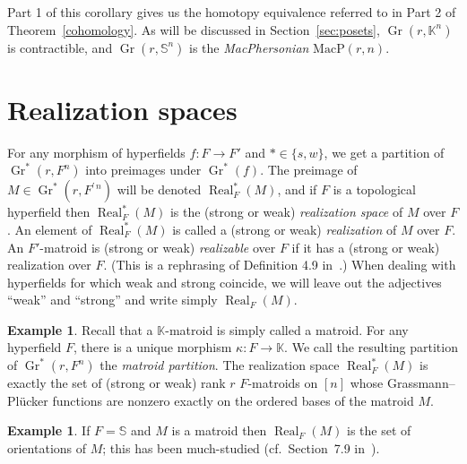 \documentclass[10pt, preprint]{article}
\theoremstyle{definition}
\newtheorem{example}[theorem]{Example}
\begin{document}
Part 1 of this corollary gives us the homotopy equivalence referred to
in Part 2 of Theorem~\ref{cohomology}. As will be discussed in
Section~\ref{sec:posets}, $\operatorname{Gr}(r, \mathbb{K}^{n})$ is
contractible, and $\operatorname{Gr}(r,\mathbb{S}^{n})$ is the
\emph{MacPhersonian} $\mathrm{MacP}(r,n)$.

\section{Realization spaces}

For any morphism of hyperfields $f: F\to F'$ and $*\in \{s,w\}$, we get
a partition of $\operatorname{Gr}^{*}(r, F^{n})$ into preimages under
$\operatorname{Gr}^{*}(f)$. The preimage of $M\in \operatorname{Gr}
^{*}(r, F^{\prime \,n})$ will be denoted $\operatorname{Real}_{F}^{*}(M)$, and
if $F$ is a topological hyperfield then $\operatorname{Real}_{F}^{*}(M)$
is the (strong or weak) \emph{realization space} of $M$ over $F$. An
element of $\operatorname{Real}_{F}^{*}(M)$ is called a (strong or weak)
\emph{realization} of $M$ over $F$. An $F'$-matroid is (strong or weak)
\emph{realizable} over $F$ if it has a (strong or weak) realization over
$F$. (This is a rephrasing of Definition 4.9
in~\cite{Baker-Bowler}.) When dealing with hyperfields for which
weak and strong coincide, we will leave out the adjectives ``weak'' and
``strong'' and write simply $\operatorname{Real}_{F}(M)$.

\begin{example}
Recall that a $\mathbb{K}$-matroid is simply called a matroid. For any
hyperfield $F$, there is a unique morphism $\kappa : F\to \mathbb{K}$.
We call the resulting partition of $\operatorname{Gr}^{*}(r, F^{n})$ the
\emph{matroid partition}. The realization space $\operatorname{Real}
_{F}^{*}(M)$ is exactly the set of (strong or weak) rank $r$
$F$-matroids on $[n]$ whose Grassmann--Pl\"{u}cker functions are nonzero
exactly on the ordered bases of the matroid $M$.
\end{example}

\begin{example}
If $F=\mathbb{S}$ and $M$ is a matroid then $\operatorname{Real}_{F}(M)$
is the set of orientations of $M$; this has been much-studied
(cf.~Section~7.9 in~\cite{BLSWZ}).
\end{example}
\end{document}
